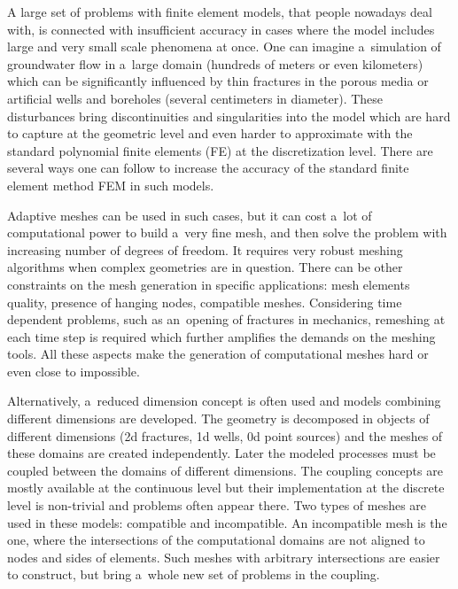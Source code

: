 
A large set of problems with finite element models, that people nowadays deal with, is connected with 
insufficient accuracy in cases where the model includes large and very small scale phenomena at once.
One can imagine a~simulation of groundwater flow in a~large domain (hundreds of meters or even kilometers) which can be significantly
influenced by thin fractures in the porous media or artificial wells and boreholes (several centimeters in diameter).
These disturbances bring discontinuities and singularities into the model which are hard to capture at the geometric level
and even harder to approximate with the standard polynomial finite elements (FE) at the discretization level.
There are several ways one can follow to increase the accuracy of the standard finite element method FEM in such models. 

Adaptive meshes can be used in such cases, but it can cost a~lot of computational power to build a~very fine mesh,
and then solve the problem with increasing number of degrees of freedom.
It requires very robust meshing algorithms when complex geometries are in question.
There can be other constraints on the mesh generation in specific applications:
mesh elements quality, presence of hanging nodes, compatible meshes.
Considering time dependent problems, such as an~opening of fractures in mechanics,
remeshing at each time step is required which further amplifies the demands on the meshing tools.
All these aspects make the generation of computational meshes hard or even close to impossible.

Alternatively, a~reduced dimension concept is often used and models combining different dimensions are developed.
The geometry is decomposed in objects of different dimensions (2d fractures, 1d wells, 0d point sources)
and the meshes of these domains are created independently.
Later the modeled processes must be coupled between the domains of different dimensions.
The coupling concepts are mostly available at the continuous level but their implementation
at the discrete level is non-trivial and problems often appear there.
Two types of meshes are used in these models: compatible and incompatible.
An incompatible mesh is the one, where the intersections of the computational domains are not aligned to nodes and sides of elements.
Such meshes with arbitrary intersections are easier to construct, 
but bring a~whole new set of problems in the coupling.


